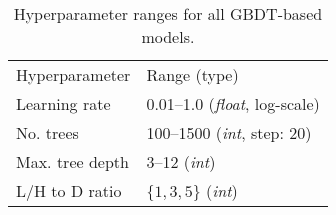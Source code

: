 \begin{table}[h]
\centering
\begin{tabular}{p{4cm}p{4cm}}
Hyperparameter & Range (type) \\
\cmidrule[\heavyrulewidth]{1-2}
Learning rate & \numrange{0.01}{1.0} (\textit{float}, log-scale) \\
No. trees & \numrange{100}{1500} (\textit{int}, step: 20) \\
Max. tree depth & \numrange{3}{12} (\textit{int}) \\
L/H to D ratio & $\{1, 3, 5\}$ (\textit{int}) \\
\end{tabular}
\caption{Hyperparameter ranges for all GBDT-based models.}
\label{tab:hyperparamxgboost}
\end{table}
